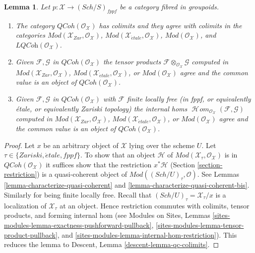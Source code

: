 \documentclass{stacks-project}
\theoremstyle{plain}
\newtheorem{lemma}[subsection]{Lemma}
\theoremstyle{definition}
\theoremstyle{remark}
\numberwithin{equation}{subsection}
\def\SheafHom{\mathop{\mathcal{H}\!\mathit{om}}\nolimits}
\def\Sch{\mathit{Sch}}
\def\etale{{\acute{e}tale}}
\def\QCoh{\mathit{QCoh}}
\begin{document}
\begin{lemma}
\label{lemma-qc-colimits}
Let $p : \mathcal{X} \to (\Sch/S)_{fppf}$ be a category
fibred in groupoids.
\begin{enumerate}
\item The category $\QCoh(\mathcal{O}_\mathcal{X})$
has colimits and they agree with colimits in the categories
$\textit{Mod}(\mathcal{X}_{Zar}, \mathcal{O}_\mathcal{X})$,
$\textit{Mod}(\mathcal{X}_\etale, \mathcal{O}_\mathcal{X})$,
$\textit{Mod}(\mathcal{O}_\mathcal{X})$, and
$\textit{LQCoh}(\mathcal{O}_\mathcal{X})$.
\item Given $\mathcal{F}, \mathcal{G}$ in $\QCoh(\mathcal{O}_\mathcal{X})$
the tensor products $\mathcal{F} \otimes_{\mathcal{O}_\mathcal{X}} \mathcal{G}$
computed in $\textit{Mod}(\mathcal{X}_{Zar}, \mathcal{O}_\mathcal{X})$,
$\textit{Mod}(\mathcal{X}_\etale, \mathcal{O}_\mathcal{X})$, or
$\textit{Mod}(\mathcal{O}_\mathcal{X})$ agree and the common value
is an object of $\QCoh(\mathcal{O}_\mathcal{X})$.
\item Given $\mathcal{F}, \mathcal{G}$ in $\QCoh(\mathcal{O}_\mathcal{X})$
with $\mathcal{F}$ finite locally free (in fppf, or equivalently \'etale, or
equivalently Zariski topology) the internal homs
$\SheafHom_{\mathcal{O}_\mathcal{X}}(\mathcal{F}, \mathcal{G})$
computed in $\textit{Mod}(\mathcal{X}_{Zar}, \mathcal{O}_\mathcal{X})$,
$\textit{Mod}(\mathcal{X}_\etale, \mathcal{O}_\mathcal{X})$, or
$\textit{Mod}(\mathcal{O}_\mathcal{X})$ agree and the common value
is an object of $\QCoh(\mathcal{O}_\mathcal{X})$.
\end{enumerate}
\end{lemma}

\begin{proof}
Let $x$ be an arbitrary object of $\mathcal{X}$ lying over the scheme $U$.
Let $\tau \in \{Zariski, \etale, fppf\}$. To show that an object $\mathcal{H}$
of $\textit{Mod}(\mathcal{X}_\tau, \mathcal{O}_\mathcal{X})$ is
in $\QCoh(\mathcal{O}_\mathcal{X})$ it suffices show that the
restriction $x^*\mathcal{H}$ (Section \ref{section-restriction})
is a quasi-coherent object of $\textit{Mod}((\Sch/U)_\tau, \mathcal{O})$.
See Lemmas \ref{lemma-characterize-quasi-coherent} and
\ref{lemma-characterize-quasi-coherent-bis}. Similarly for being
finite locally free. Recall that $(\Sch/U)_\tau = \mathcal{X}_\tau/x$
is a localization of $\mathcal{X}_\tau$ at an object. Hence restriction
commutes with colimits, tensor products, and forming internal hom
(see Modules on Sites, Lemmas
\ref{sites-modules-lemma-exactness-pushforward-pullback},
\ref{sites-modules-lemma-tensor-product-pullback}, and
\ref{sites-modules-lemma-internal-hom-restriction}).
This reduces the lemma to Descent, Lemma \ref{descent-lemma-qc-colimits}.
\end{proof}
\end{document}
